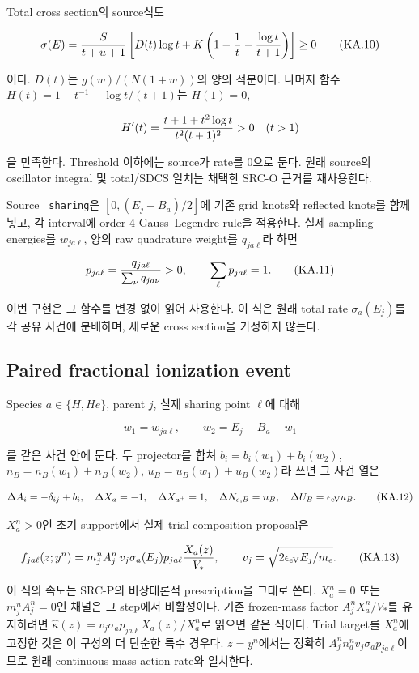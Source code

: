Total cross section의 source식도

\[
 \sigma(E)={S\over t+u+1}\left[D(t)\log t+
     K\left(1-{1\over t}-{\log t\over t+1}\right)\right]\ge0
 \tag{KA.10}
\]

이다. \(D(t)\)는 \(g(w)/(N(1+w))\)의 양의 적분이다. 나머지 함수 \(H(t)=1-t^{-1}-\log t/(t+1)\)는 \(H(1)=0\),

\[
 H'(t)={t+1+t^2\log t\over t^2(t+1)^2}>0\quad(t>1)
\]

을 만족한다. Threshold 이하에는 source가 rate를 0으로 둔다. 원래 source의 oscillator integral 및 total/SDCS 일치는 채택한 SRC-O 근거를 재사용한다.

Source \texttt{\_sharing}은 \([0,(E_j-B_a)/2]\)에 기존 grid knots와 reflected knots를 함께 넣고, 각 interval에 order-4 Gauss--Legendre rule을 적용한다. 실제 sampling energies를 \(w_{ja\ell}\), 양의 raw quadrature weight를 \(q_{ja\ell}\)라 하면

\[
 p_{ja\ell}={q_{ja\ell}\over\sum_\nu q_{ja\nu}}>0,\qquad
 \sum_\ell p_{ja\ell}=1.
 \tag{KA.11}
\]

이번 구현은 그 함수를 변경 없이 읽어 사용한다. 이 식은 원래 total rate \(\sigma_a(E_j)\)를 각 공유 사건에 분배하며, 새로운 cross section을 가정하지 않는다.

\hypertarget{paired-fractional-ionization-event}{%
\subsection{Paired fractional ionization event}\label{paired-fractional-ionization-event}}

Species \(a\in\{H,He\}\), parent \(j\), 실제 sharing point \(\ell\)에 대해

\[
 w_1=w_{ja\ell},\qquad w_2=E_j-B_a-w_1
\]

를 같은 사건 안에 둔다. 두 projector를 합쳐 \(b_i=b_i(w_1)+b_i(w_2)\), \(n_B=n_B(w_1)+n_B(w_2)\), \(u_B=u_B(w_1)+u_B(w_2)\)라 쓰면 그 사건 열은

\[
 \Delta A_i=-\delta_{ij}+b_i,\quad
 \Delta X_a=-1,\quad\Delta X_{a^+}=1,\quad
 \Delta N_{e,B}=n_B,\quad\Delta U_B=\epsilon_{\rm eV}u_B.
 \tag{KA.12}
\]

\(X_a^n>0\)인 초기 support에서 실제 trial composition proposal은

\[
 f_{ja\ell}(z;y^n)=m_j^n A_j^n\,
       v_j\sigma_a(E_j)p_{ja\ell}{X_a(z)\over V_*},\qquad
 v_j=\sqrt{2\epsilon_{\rm eV}E_j/m_e}.
 \tag{KA.13}
\]

이 식의 속도는 SRC-P의 비상대론적 prescription을 그대로 쓴다. \(X_a^n=0\) 또는 \(m_j^nA_j^n=0\)인 채널은 그 step에서 비활성이다. 기존 frozen-mass factor \(A_j^nX_a^n/V_*\)를 유지하려면 \(\widehat\kappa(z)=v_j\sigma_a p_{ja\ell}X_a(z)/X_a^n\)로 읽으면 같은 식이다. Trial target를 \(X_a^n\)에 고정한 것은 이 구성의 더 단순한 특수 경우다. \(z=y^n\)에서는 정확히 \(A_j^n n_a^n v_j\sigma_a p_{ja\ell}\)이므로 원래 continuous mass-action rate와 일치한다.

